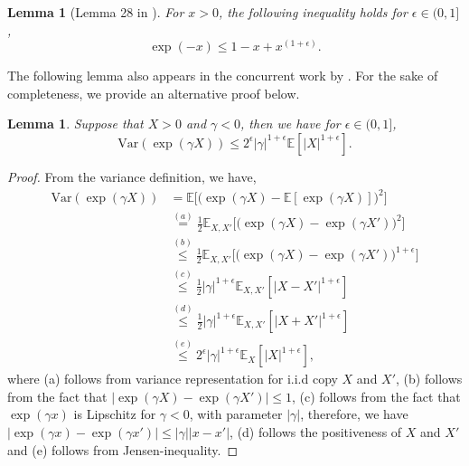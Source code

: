 \documentclass{article}
\theoremstyle{plain}
\theoremstyle{plain}
\newtheorem{lemma}[theorem]{Lemma}
\theoremstyle{definition}
\theoremstyle{remark}
\newcommand{\var}{\mathrm{Var}}
\begin{document}
\begin{lemma}[Lemma 28 in \citep{lugosi2023online}]\label{lem:exp_bound}
    For $x>0$, the following inequality holds for $\epsilon\in(0,1]$,
    \begin{equation}
        \exp(-x)\leq 1-x+x^{(1+\epsilon)}.
    \end{equation}
\end{lemma}
The following lemma also appears in the concurrent work by \citet{behnamnialog}. For the sake of completeness, we provide an alternative proof below.
\begin{lemma}\label{lem_var_bound_epsilon}
Suppose that $X>0$ and $\gamma<0$, then we have for $\epsilon\in(0,1]$,
\begin{equation}
     \var(\exp(\gamma X))\leq 2^{\epsilon}|\gamma|^{1+\epsilon} \mathbb{E}[|X|^{1+\epsilon}].
\end{equation}
\end{lemma}
\begin{proof}
    From the variance definition, we have,
    \begin{align}
      \var(\exp(\gamma X))&=\mathbb{E}\Big[\Big(\exp(\gamma X)-\mathbb{E}[\exp(\gamma X)]\Big)^2\Big]\\
      &\overset{(a)}{=}\frac{1}{2}\mathbb{E}_{X,X'}\Big[\Big(\exp(\gamma X)-\exp(\gamma X')\Big)^2\Big]\\
      &\overset{(b)}{\leq}\frac{1}{2}\mathbb{E}_{X,X'}\Big[\Big(\exp(\gamma X)-\exp(\gamma X')\Big)^{1+\epsilon}\Big]
      \\
      &\overset{(c)}{\leq} \frac{1}{2}|\gamma|^{1+\epsilon} \mathbb{E}_{X,X'}[|X-X'|^{1+\epsilon}]\\
      &\overset{(d)}{\leq}\frac{1}{2}|\gamma|^{1+\epsilon} \mathbb{E}_{X,X'}[|X+X'|^{1+\epsilon}]
      \\
      &\overset{(e)}{\leq}2^{\epsilon} |\gamma|^{1+\epsilon} \mathbb{E}_{X}[|X|^{1+\epsilon}],
    \end{align}
    where (a) follows from variance representation for i.i.d copy $X$ and $X'$, (b) follows from the fact that $|\exp(\gamma X)-\exp(\gamma X')|\leq 1$, (c) follows from the fact that $\exp(\gamma x)$ is Lipschitz for $\gamma<0$, with parameter $|\gamma|$, therefore, we have $|\exp(\gamma x)-\exp(\gamma x')|\leq |\gamma||x-x'|$, (d) follows the positiveness of $X$ and $X'$ and (e) follows from Jensen-inequality.
\end{proof}
\end{document}
